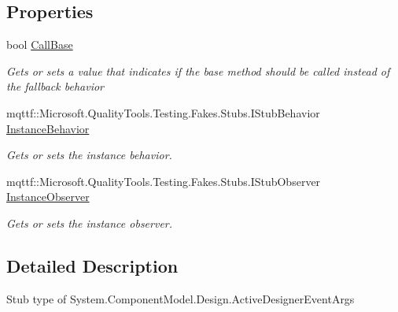 \subsection*{Properties}
\begin{DoxyCompactItemize}
\item 
bool \hyperlink{class_system_1_1_component_model_1_1_design_1_1_fakes_1_1_stub_active_designer_event_args_a210c2ddf78733f4b1f171d5755c96743}{Call\-Base}
\begin{DoxyCompactList}\small\item\em Gets or sets a value that indicates if the base method should be called instead of the fallback behavior\end{DoxyCompactList}\item 
mqttf\-::\-Microsoft.\-Quality\-Tools.\-Testing.\-Fakes.\-Stubs.\-I\-Stub\-Behavior \hyperlink{class_system_1_1_component_model_1_1_design_1_1_fakes_1_1_stub_active_designer_event_args_a7bae42978505cbc127942b017944e3a0}{Instance\-Behavior}
\begin{DoxyCompactList}\small\item\em Gets or sets the instance behavior.\end{DoxyCompactList}\item 
mqttf\-::\-Microsoft.\-Quality\-Tools.\-Testing.\-Fakes.\-Stubs.\-I\-Stub\-Observer \hyperlink{class_system_1_1_component_model_1_1_design_1_1_fakes_1_1_stub_active_designer_event_args_a96b6a4691bfe6d1fbbd511fc803737bc}{Instance\-Observer}
\begin{DoxyCompactList}\small\item\em Gets or sets the instance observer.\end{DoxyCompactList}\end{DoxyCompactItemize}


\subsection{Detailed Description}
Stub type of System.\-Component\-Model.\-Design.\-Active\-Designer\-Event\-Args



